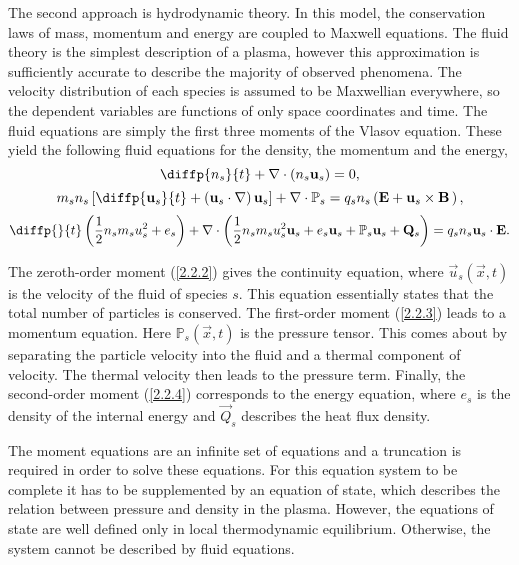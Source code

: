 The second approach is hydrodynamic theory. In this model, the conservation laws of mass, momentum and energy are coupled to Maxwell equations. The fluid theory is the simplest description of a plasma, however this approximation is sufficiently accurate to describe the majority of observed phenomena. The velocity distribution of each species is assumed to be Maxwellian everywhere, so the dependent variables are functions of only space coordinates and time. The fluid equations are simply the first three moments of the Vlasov equation. These yield the following fluid equations for the density, the momentum and the energy,
\begin{equation}
\label{2.2.2}
\diffp{n_s}{t} + \nabla \cdot \left(n_s \vec{u}_s \right) = 0,
\end{equation}
\begin{equation}
\label{2.2.3}
m_s n_s \left[ \diffp{\vec{u}_s}{t} + \left(\vec{u}_s \cdot \nabla \right) \vec{u}_s \right] + \nabla \cdot \mathbb{P}_s = q_s n_s \left(\vec{E} + \vec{u}_s \times \vec{B} \, \right),
\end{equation}
\begin{equation}
\label{2.2.4}
\diffp{}{t} \left(\frac{1}{2} n_s m_s u_s^2 + e_{s} \right) + \nabla \cdot \left(\frac{1}{2} n_s m_s u_s^2 \vec{u}_s + e_{s} \vec{u}_s + \mathbb{P}_s \vec{u}_s + \vec{Q}_s \right) = q_s n_s \vec{u}_s \cdot \vec{E}.
\end{equation}

The zeroth-order moment (\ref{2.2.2}) gives the continuity equation, where $ \vec{u}_s\left(\vec{x}, t \right) $ is the velocity of the fluid of species $ s $. This equation essentially states that the total number of particles is conserved. The first-order moment (\ref{2.2.3}) leads to a momentum equation. Here $ \mathbb{P}_s\left(\vec{x}, t \right) $ is the pressure tensor. This comes about by separating the particle velocity into the fluid and a thermal component of velocity. The thermal velocity then leads to the pressure term. Finally, the second-order moment (\ref{2.2.4}) corresponds to the energy equation, where $ e_{s} $ is the density of the internal energy and $ \vec{Q}_s $ describes the heat flux density.

The moment equations are an infinite set of equations and a truncation is required in order to solve these equations. For this equation system to be complete it has to be supplemented by an equation of state, which describes the relation between pressure and density in the plasma. However, the equations of state are well defined only in local thermodynamic equilibrium. Otherwise, the system cannot be described by fluid equations.

